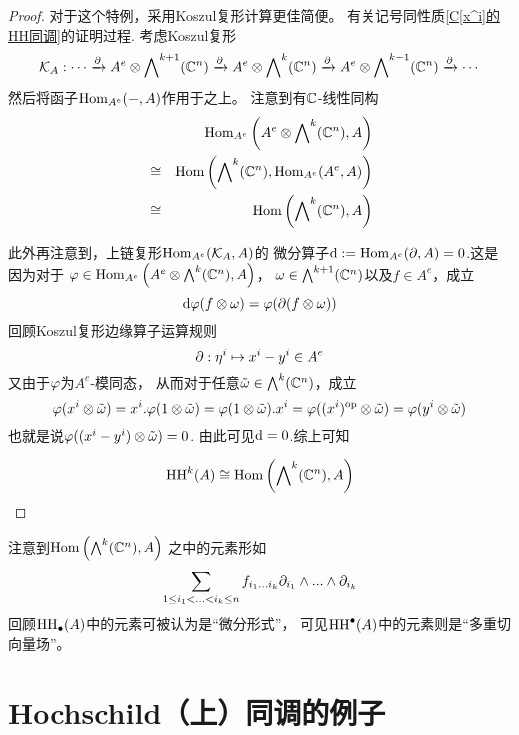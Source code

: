 \begin{proof}
对于这个特例，采用Koszul复形计算更佳简便。
有关记号同性质\ref{C[x^i]的HH同调}的证明过程.
考虑Koszul复形
$$
\mathcal{K}_A:\cdots
\xrightarrow{\partial}A^e\otimes\bigwedge\nolimits^{k+1}(\mathbb{C}^n)
\xrightarrow{\partial}A^e\otimes\bigwedge\nolimits^{k}(\mathbb{C}^n)
\xrightarrow{\partial}A^e\otimes\bigwedge\nolimits^{k-1}(\mathbb{C}^n)
\xrightarrow{\partial}\cdots
$$
然后将函子$\operatorname{Hom}_{A^e}(-,A)$作用于之上。
注意到有$\mathbb{C}$-线性同构
\begin{eqnarray*}
&&      \operatorname{Hom}_{A^e}\left(A^e\otimes\bigwedge\nolimits^{k}(\mathbb{C}^n),A\right)\\
&\cong& \operatorname{Hom}\left(\bigwedge\nolimits^{k}(\mathbb{C}^n),\operatorname{Hom}_{A^e}(A^e,A)\right)\\
&\cong& \operatorname{Hom}\left(\bigwedge\nolimits^{k}(\mathbb{C}^n),A\right)
\end{eqnarray*}

此外再注意到，上链复形$\operatorname{Hom}_{A^e}(\mathcal{K}_A,A)$的
微分算子$\mathrm{d}:=\operatorname{Hom}_{A^e}(\partial,A)=0$.这是因为对于
$\varphi\in\operatorname{Hom}_{A^e}\left(A^e\otimes\bigwedge\nolimits^{k}(\mathbb{C}^n),A\right)$，
$\omega\in\bigwedge\nolimits^{k+1}(\mathbb{C}^n)$以及$f\in A^e$，成立
$$\mathrm{d}\varphi(f\otimes\omega)=\varphi(\partial(f\otimes\omega))$$
回顾Koszul复形边缘算子运算规则
$$\partial:\eta^i\mapsto x^i-y^i\in A^e$$
又由于$\varphi$为$A^e$-模同态，
从而对于任意$\tilde{\omega}\in\bigwedge\nolimits^{k}(\mathbb{C}^n)$，成立
$$
\varphi(x^i\otimes\tilde{\omega})
=x^i.\varphi(1\otimes\tilde{\omega})
=\varphi(1\otimes\tilde{\omega}).x^i
=\varphi((x^i)^{\text{op}}\otimes\tilde{\omega})
=\varphi(y^i\otimes\tilde{\omega})$$
也就是说$\varphi((x^i-y^i)\otimes\tilde{\omega})=0$.
由此可见$\mathrm{d}=0$.综上可知

$$\operatorname{HH}^k(A)\cong
\operatorname{Hom}\left(\bigwedge\nolimits^{k}(\mathbb{C}^n),A\right)$$

\end{proof}

注意到$\operatorname{Hom}\left(\bigwedge\nolimits^{k}(\mathbb{C}^n),A\right)$
之中的元素形如
$$
\sum_{1\leq i_1<...<i_k\leq n}
f_{i_1...i_k}\partial_{i_1}\wedge...\wedge\partial_{i_k}
$$
回顾$\operatorname{HH}_{\bullet}(A)$中的元素可被认为是“微分形式”，
可见$\operatorname{HH}^{\bullet}(A)$中的元素则是“多重切向量场”。


\section{Hochschild（上）同调的例子}

